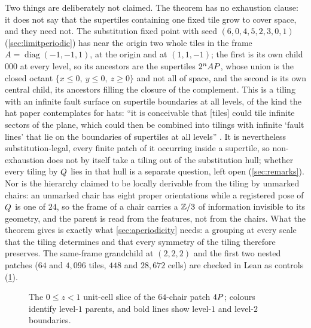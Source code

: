 Two things are deliberately not claimed. The theorem has no exhaustion clause: it does not say
that the supertiles containing one fixed tile grow to cover space, and they need not. The
substitution fixed point with seed $(6,0,4,5,2,3,0,1)$ (\cref{sec:limitperiodic}) has near the
origin two whole tiles in the frame $A=\operatorname{diag}(-1,-1,1)$, at the origin and at
$(1,1,-1)$; the first is its own child $000$ at every level, so its ancestors are the supertiles
$2^nAP$, whose union is the closed octant $\{x\le0,\ y\le0,\ z\ge0\}$ and not all of
space, and the second is its own central child, its ancestors filling the closure of the
complement. This is a tiling with an infinite fault surface on supertile boundaries at all
levels, of the kind the hat paper contemplates for hats: ``it is conceivable that [tiles] could
tile infinite sectors of the plane, which could then be combined into tilings with infinite
`fault lines' that lie on the boundaries of supertiles at all levels'' \cite{SMKGS24}. It is
nevertheless substitution-legal, every finite patch of it occurring inside a supertile, so
non-exhaustion does not by itself take a tiling out of the substitution hull; whether every
tiling by $Q$ lies in that hull is a separate question, left open (\cref{sec:remarks}).
Nor is the hierarchy claimed to
be locally derivable from the tiling by unmarked chairs: an unmarked chair has eight proper
orientations while a registered pose of $Q$ is one of $24$, so the frame of a chair carries
a $\mathbb{Z}/3$ of information invisible to its geometry, and the parent is read from the features,
not from the chairs. What the theorem gives is exactly what \cref{sec:aperiodicity} needs: a
grouping at every scale that the tiling determines and that every symmetry of the tiling
therefore preserves. The same-frame grandchild at $(2,2,2)$ and the first two nested patches
($64$ and $4{,}096$ tiles, $448$ and $28{,}672$ cells) are checked in Lean as controls
(\cref{fig:nesting}).

\begin{figure}[ht]
  \centering
  \resizebox{0.8\linewidth}{!}{}
  \caption{The $0\le z<1$ unit-cell slice of the $64$-chair patch $4P$; colours identify
  level-$1$ parents, and bold lines show level-$1$ and level-$2$ boundaries.}
  \label{fig:nesting}
\end{figure}
